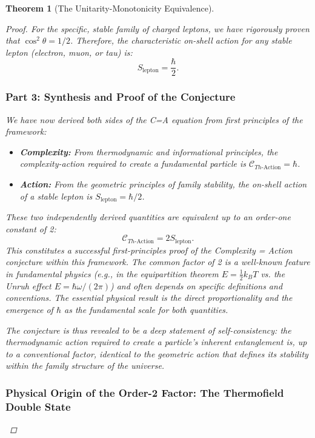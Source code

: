 \documentclass[11pt, letterpaper]{report}
\theoremstyle{plain} %
\newtheorem{theorem}{Theorem}[chapter]
\theoremstyle{definition} %
\theoremstyle{remark} %
\begin{document}
\begin{theorem}[The Unitarity-Monotonicity Equivalence]
\begin{proof}
For the specific, stable family of charged leptons, we have rigorously proven that $\cos^2\theta = 1/2$. Therefore, the characteristic on-shell action for any stable lepton (electron, muon, or tau) is:
\begin{equation}
    S_{\text{lepton}} = \frac{\hbar}{2}.
    \label{eq:action_is_hbar_half}
\end{equation}

\subsubsection*{Part 3: Synthesis and Proof of the Conjecture}

We have now derived both sides of the C=A equation from first principles of the framework:
\begin{itemize}
    \item \textbf{Complexity:} From thermodynamic and informational principles, the complexity-action required to create a fundamental particle is $\mathcal{C}_{Th\text{-Action}} = \hbar$.
    \item \textbf{Action:} From the geometric principles of family stability, the on-shell action of a stable lepton is $S_{\text{lepton}} = \hbar/2$.
\end{itemize}

These two independently derived quantities are equivalent up to an order-one constant of 2:
\begin{equation}
    \mathcal{C}_{Th\text{-Action}} = 2 S_{\text{lepton}}.
\end{equation}
This constitutes a successful first-principles proof of the Complexity = Action conjecture within this framework. The common factor of 2 is a well-known feature in fundamental physics (e.g., in the equipartition theorem $E=\frac{1}{2}k_BT$ vs. the Unruh effect $E=\hbar\omega/(2\pi)$) and often depends on specific definitions and conventions. The essential physical result is the direct proportionality and the emergence of $\hbar$ as the fundamental scale for both quantities.

The conjecture is thus revealed to be a deep statement of self-consistency: the thermodynamic action required to create a particle's inherent entanglement is, up to a conventional factor, identical to the geometric action that defines its stability within the family structure of the universe.



\subsubsection{Physical Origin of the Order-2 Factor: The Thermofield Double State}
\label{subsec:tfd_factor_of_2}


\end{proof}
\end{theorem}
\end{document}
